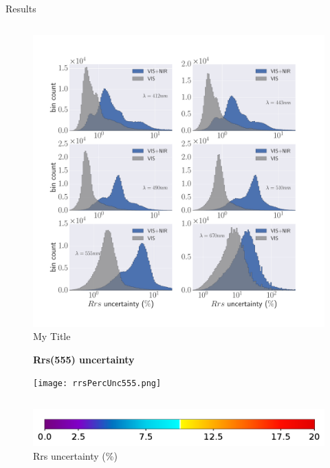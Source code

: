 \documentclass[final]{beamer}
\newlength{\onecolwid}
\newlength{\twocolwid}
\begin{document}
\begin{frame}[t]
\begin{columns}[t]
\begin{column}{\twocolwid}
\begin{block}{Results}
\begin{columns}[t,totalwidth=\twocolwid]
\begin{column}{\onecolwid}
\begin{figure}
\vspace{2ex}
\caption{My Title}\par%
\vspace{-1in}
\includegraphics[width=1.0\linewidth]{Vis_vs_VISNIR.pdf}
\end{figure}
\begin{figure}
\centering
\textbf{Rrs(555) uncertainty}\par\medskip
\texttt{[image: rrsPercUnc555.png]}
\end{figure}
\end{column} %

\end{columns} %
\end{block}
\begin{figure}
\centering
\includegraphics[width=1.0\linewidth]{rrsUNCcolorbar.png}
\\{Rrs uncertainty (\%)}\par\medskip
\end{figure}



\end{column}
\end{columns}
\end{frame}
\end{document}
